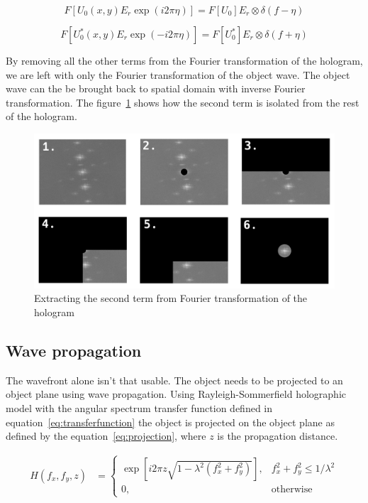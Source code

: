 \documentclass[12pt,a4paper,english
]{tunithesis}
\begin{document}
\begin{equation}
F [U_0(x, y)E_r \exp(i2\pi\eta)] = F [U_0] E_r \otimes \delta(f - \eta)
\label{eq:secondterm}
\end{equation}

\begin{equation}
F [U_0^*(x, y)E_r \exp(-i2\pi\eta)] = F [U_0^*] E_r \otimes \delta(f + \eta)
\label{eq:thirdterm}
\end{equation}

By removing all the other terms from the Fourier transformation of the hologram, we are left with only the Fourier transformation of the object wave. The object wave can the be brought back to spatial domain with inverse Fourier transformation. The figure~\ref{fig:fourierfiltering} shows how the second term is isolated from the rest of the hologram.

\begin{figure}
  \centering
  \includegraphics[width=\columnwidth]{img/filter_process.png}
  \caption{Extracting the second term from Fourier transformation of the hologram}
  \label{fig:fourierfiltering}
\end{figure}

\subsection{Wave propagation}
The wavefront alone isn't that usable. The object needs to be projected to an object plane using wave propagation. Using Rayleigh-Sommerfield holographic model with the angular spectrum transfer function defined in equation~\ref{eq:transferfunction} the object is projected on the object plane as defined by the equation~\ref{eq:projection}, where $z$ is the propagation distance. 

\begin{align}
H(f_x,f_y,z) &=
\begin{cases}
\exp[i2\pi z \sqrt{1 - \lambda^2 (f_x^2 + f_y^2)}],& f_x^2 + f_y^2 \leq 1/\lambda^2 \\
0, & \text{otherwise}
\end{cases} \label{eq:transferfunction}
\end{align}
\end{document}

